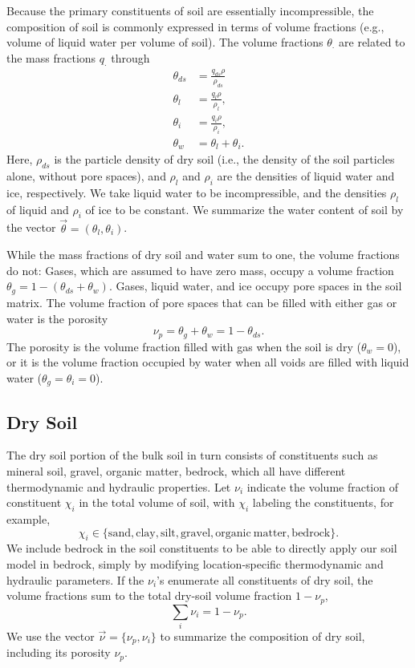 \documentclass{report}
\begin{document}
Because the primary constituents of soil are essentially incompressible, the composition of soil is commonly expressed in terms of volume fractions (e.g., volume of liquid water per volume of soil). The volume fractions $\theta_{\cdot}$ are related to the mass fractions $q_{\cdot}$ through
\begin{subequations}\label{e:vol_fractions}
\begin{align}
    \theta_{ds} &= \frac{q_{ds} \rho}{\rho_{ds}} \\
    \theta_l &= \frac{q_l \rho}{\rho_l}, \\
    \theta_i &= \frac{q_i \rho}{\rho_i}, \\
    \theta_w &= \theta_l + \theta_i.
\end{align}
\end{subequations}
Here, $\rho_{ds}$ is the particle density of dry soil (i.e., the density of the soil particles alone, without pore spaces), and $\rho_l$ and $\rho_i$ are the densities of liquid water and ice, respectively. We take liquid water to be incompressible, and the densities $\rho_l$ of liquid and $\rho_i$ of ice to be constant. We summarize the water content of soil by the vector $\vec{\theta} = (\theta_l, \theta_i)$.

While the mass fractions of dry soil and water sum to one, the volume fractions do not: Gases, which are assumed to have zero mass, occupy a volume fraction $\theta_g = 1 - (\theta_{ds} + \theta_w)$. Gases, liquid water, and ice occupy pore spaces in the soil matrix. The volume fraction of pore spaces that can be filled with either gas or water is the porosity 
\begin{equation}\label{e:porosity}
    \nu_p = \theta_g + \theta_w =  1 - \theta_{ds}.
\end{equation}
The porosity is the volume fraction filled with gas when the soil is dry ($\theta_w=0$), or it is the volume fraction occupied by water when all voids are filled with liquid water ($\theta_g = \theta_i = 0$). 

\subsection{Dry Soil}

The dry soil portion of the bulk soil in turn consists of constituents such as mineral soil, gravel, organic matter, bedrock, which all have different thermodynamic and hydraulic properties.  Let $\nu_{i}$ indicate the volume fraction of constituent $\chi_i$ in the total volume of soil, with $\chi_i$ labeling the constituents, for example,
\[
\chi_i \in \{ {\mathrm{sand}}, {\mathrm{clay}}, {\mathrm{silt}}, {\mathrm{gravel}}, \mathrm{organic~matter}, {\mathrm{bedrock}} \}.
\]
We include bedrock in the soil constituents to be able to directly apply our soil model in bedrock, simply by modifying location-specific thermodynamic and hydraulic parameters. If the $\nu_i$'s enumerate all constituents of dry soil, the volume fractions sum to the total dry-soil volume fraction $1-\nu_p$,
\[
\sum_i \nu_{i} = 1-\nu_p.
\] 
We use the vector $\vec{\nu} = \{\nu_p, \nu_i\}$ to summarize the composition of dry soil, including its porosity $\nu_p$.
\end{document}
